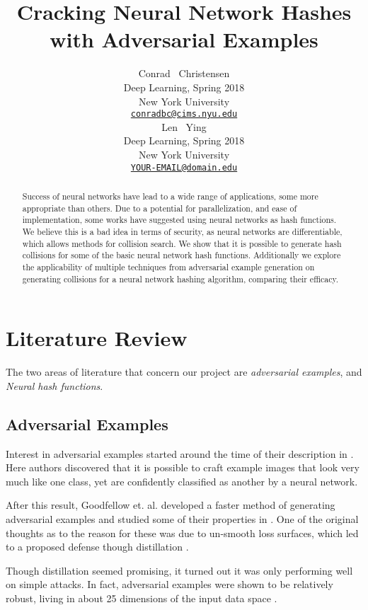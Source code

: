 \documentclass{article}
\title{Cracking Neural Network Hashes with Adversarial Examples}
\author{
  Conrad ~Christensen\\
  Deep Learning, Spring 2018\\
  New York University\\
  \href{mailto:conradbc@cims.nyu.edu}{\texttt{conradbc@cims.nyu.edu}} \\
  \And
  Len ~Ying\\
  Deep Learning, Spring 2018\\
  New York University\\
  \href{mailto:YOUR-EMAIL@domain.edu}{\texttt{YOUR-EMAIL@domain.edu}}
}
\begin{document}

\maketitle

\begin{abstract}
    Success of neural networks have lead to a wide range of applications, some
    more appropriate than others. Due to a potential for parallelization, and
    ease of implementation, some works have suggested using neural networks as
    hash functions.  We believe this is a bad idea in terms of security, as
    neural networks are differentiable, which allows methods for collision
    search. We show that it is possible to generate hash collisions for some of
    the basic neural network hash functions. Additionally we explore the
    applicability of multiple techniques from adversarial example generation on
    generating collisions for a neural network hashing algorithm, comparing
    their efficacy.
\end{abstract}

\section{Literature Review}

The two areas of literature that concern our project are \emph{adversarial examples},
and \emph{Neural hash functions}.

\subsection{Adversarial Examples}
Interest in adversarial examples started around the time of their description
in \cite{intriguing}. Here authors discovered that it is possible to craft
example images that look very much like one class, yet are confidently classified
as another by a neural network.

After this result, Goodfellow et. al. developed a faster method of generating
adversarial examples and studied some of their properties in \cite{explaining}.
One of the original thoughts as to the reason for these was due to un-smooth 
loss surfaces, which led to a proposed defense though distillation \cite{distil}.

Though distillation seemed promising, it turned out it was only performing well
on simple attacks. In fact, adversarial examples were shown to be relatively
robust, living in about 25 dimensions of the input data space \cite{space}.
\end{document}
